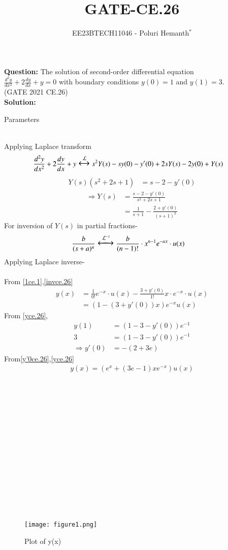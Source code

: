 \documentclass[journal,12pt,twocolumn]{IEEEtran}
\theoremstyle{remark}
\begin{document}

\vspace{3cm}

\title{GATE-CE.26}
\author{EE23BTECH11046 - Poluri Hemanth$^{*}$}
\maketitle
\textbf{Question:}
The solution of second-order differential equation \\ $\frac{d^2y}{dx^2}+2\frac{dy}{dx}+y=0$ with boundary conditions $y(0)=1$ and $y(1)=3$.\\
\hfill{(GATE  2021 CE.26)}\\
\textbf{Solution:}
\begin{table}[h!]
        
        \caption{Parameters}
        \label{tab:es.47}
\end{table}\\
Applying Laplace transform
\begin{align}
	\frac{d^2y}{dx^2}+2\frac{dy}{dx}+y&\Large\xleftrightarrow{\mathcal{L}}s^2Y(s)-sy(0)-y'(0)+2sY(s)-2y(0)+Y(s)
\end{align}
\begin{align}
	Y(s)(s^2+2s+1)&=s-2-y'(0)
\end{align}
\begin{align}
	\Rightarrow Y(s)&=\frac{s-2-y'(0)}{s^2+2s+1}\\
	&=\frac{1}{s+1}-\frac{2+y'(0)}{(s+1)^2}\label{1ce.1}
\end{align}
For inversion of $Y(s)$ in partial fractions-
\begin{align}
        &\frac{b}{(s+a)^n}\Large\xleftrightarrow{\mathcal{L}^{-1}}\frac{b}{(n-1)!}\cdot x^{n-1} e^{-ax}\cdot u(x)\label{invce.26}
\end{align}
Applying Laplace inverse-\\
\\From \eqref{1ce.1},\eqref{invce.26}
\begin{align}
	y(x)&=\frac{1}{0!} e^{-x}\cdot u(x)-\frac{3+y'(0)}{1!}x\cdot e^{-x}\cdot u(x)\\
	&=(1-(3+y'(0))x)e^{-x}u(x)\label{yce.26}
\end{align}
From \eqref{yce.26},
\begin{align}
	y(1)&=(1-3-y'(0))e^{-1}\\
	3&=(1-3-y'(0))e^{-1}\\
	\Rightarrow y'(0)&=-(2+3e)\label{y'0ce.26}
\end{align}
From\eqref{y'0ce.26},\eqref{yce.26}
\begin{align}
	y(x)=(e^x+(3e-1)xe^{-x})u(x)
\end{align}
\\
\\
\\
\\
\\
\\
\\
\\
\\
\\
\\
\\
\\
\\
\begin{figure}[h!]
    \centering
    \texttt{[image: figure1.png]}
        \caption{Plot of y(x)}
    \label{fig:enter-label}
\end{figure}
\end{document}
